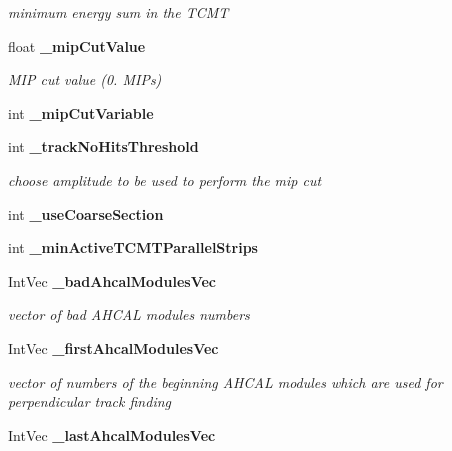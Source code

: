 \begin{DoxyCompactItemize}
\begin{DoxyCompactList}\small\item\em minimum energy sum in the T\-C\-M\-T \end{DoxyCompactList}\item 
float {\bf \-\_\-mip\-Cut\-Value}\label{classCALICE_1_1AngleTrackFinder_a09632c19bf97a231d9ab2c1e6e32cc78}

\begin{DoxyCompactList}\small\item\em M\-I\-P cut value (0. M\-I\-Ps) \end{DoxyCompactList}\item 
int {\bfseries \-\_\-mip\-Cut\-Variable}\label{classCALICE_1_1AngleTrackFinder_afeb7153710a99c4b36d0842d2df63335}

\item 
int {\bf \-\_\-track\-No\-Hits\-Threshold}
\begin{DoxyCompactList}\small\item\em choose amplitude to be used to perform the mip cut \end{DoxyCompactList}\item 
int {\bfseries \-\_\-use\-Coarse\-Section}\label{classCALICE_1_1AngleTrackFinder_acbeb9d16089487bbc26fa28c1a83ca78}

\item 
int {\bfseries \-\_\-min\-Active\-T\-C\-M\-T\-Parallel\-Strips}\label{classCALICE_1_1AngleTrackFinder_ac050b4b2a689ca4d482a6ad75a53991c}

\item 
Int\-Vec {\bf \-\_\-bad\-Ahcal\-Modules\-Vec}\label{classCALICE_1_1AngleTrackFinder_a6d4442136ce5b168d27f32f3f753164c}

\begin{DoxyCompactList}\small\item\em vector of bad A\-H\-C\-A\-L modules numbers \end{DoxyCompactList}\item 
Int\-Vec {\bf \-\_\-first\-Ahcal\-Modules\-Vec}\label{classCALICE_1_1AngleTrackFinder_a53176eb4d890fcf6f41291a7aa7f7ecd}

\begin{DoxyCompactList}\small\item\em vector of numbers of the beginning A\-H\-C\-A\-L modules which are used for perpendicular track finding \end{DoxyCompactList}\item 
Int\-Vec {\bf \-\_\-last\-Ahcal\-Modules\-Vec}\label{classCALICE_1_1AngleTrackFinder_afe5e51f2a91a84dabaed6f6ad9cd60e9}


\end{DoxyCompactItemize}
